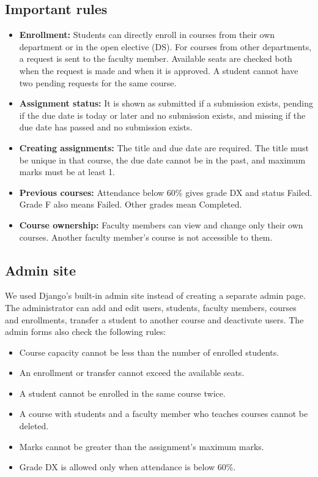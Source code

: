\documentclass[11pt,a4paper]{article}
\begin{document}
\subsection{Important rules}
\begin{itemize}
    \item \textbf{Enrollment:} Students can directly enroll in courses from their
    own department or in the open elective (DS). For courses from other
    departments, a request is sent to the faculty member. Available seats are
    checked both when the request is made and when it is approved. A student
    cannot have two pending requests for the same course.
    \item \textbf{Assignment status:} It is shown as submitted if a submission
    exists, pending if the due date is today or later and no submission exists,
    and missing if the due date has passed and no submission exists.
    \item \textbf{Creating assignments:} The title and due date are required.
    The title must be unique in that course, the due date cannot be in the past,
    and maximum marks must be at least 1.
    \item \textbf{Previous courses:} Attendance below 60\% gives grade DX and
    status Failed. Grade F also means Failed. Other grades mean Completed.
    \item \textbf{Course ownership:} Faculty members can view and change only
    their own courses. Another faculty member's course is not accessible to them.
\end{itemize}

\subsection{Admin site}
We used Django's built-in admin site instead of creating a separate admin page.
The administrator can add and edit users, students, faculty members, courses
and enrollments, transfer a student to another course and deactivate users.
The admin forms also check the following rules:
\begin{itemize}
    \item Course capacity cannot be less than the number of enrolled students.
    \item An enrollment or transfer cannot exceed the available seats.
    \item A student cannot be enrolled in the same course twice.
    \item A course with students and a faculty member who teaches courses cannot
    be deleted.
    \item Marks cannot be greater than the assignment's maximum marks.
    \item Grade DX is allowed only when attendance is below 60\%.
\end{itemize}
\end{document}
